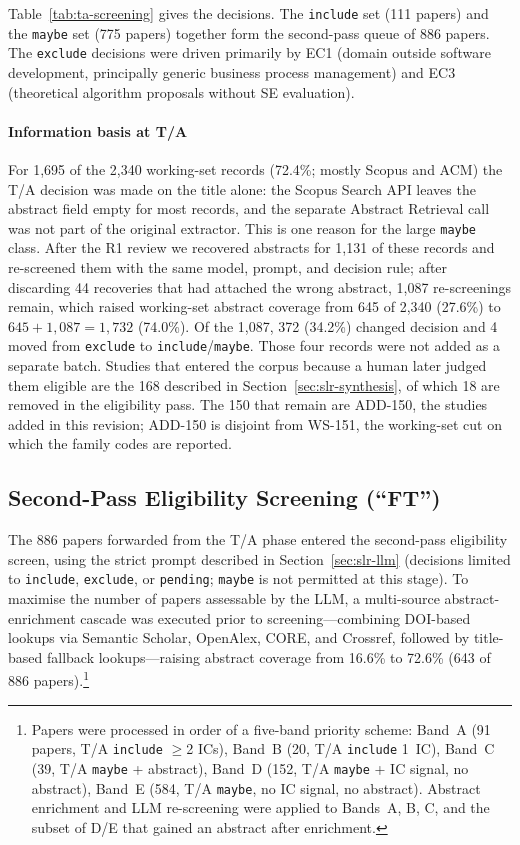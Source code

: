 Table~\ref{tab:ta-screening} gives the decisions. The \texttt{include}
set (111 papers) and the \texttt{maybe} set (775 papers)
together form the second-pass queue of 886 papers. The
\texttt{exclude} decisions were driven primarily by EC1 (domain outside
software development, principally generic business process management) and EC3
(theoretical algorithm proposals without SE evaluation).

\paragraph{Information basis at T/A} For 1{,}695 of the 2{,}340 working-set
records (72.4\%; mostly Scopus and ACM) the T/A decision was made on the
title alone: the Scopus Search API leaves the abstract field empty for most
records, and the separate Abstract Retrieval call was not part of the
original extractor. This is one reason for the large \texttt{maybe} class.
After the R1 review we recovered abstracts for 1{,}131 of these records
and re-screened them with the same model, prompt, and decision rule; after
discarding 44 recoveries that had attached the wrong abstract, 1{,}087
re-screenings remain, which raised working-set abstract coverage from 645
of 2{,}340 (27.6\%) to $645+1{,}087 = 1{,}732$ (74.0\%). Of the 1{,}087,
372 (34.2\%) changed decision and 4 moved from
\texttt{exclude} to \texttt{include}/\texttt{maybe}. Those four records were
not added as a separate batch. Studies that entered the corpus because a
human later judged them eligible are the 168 described in
Section~\ref{sec:slr-synthesis}, of which 18 are removed in the eligibility
pass. The 150 that remain are ADD-150, the studies added in this
revision; ADD-150 is disjoint from WS-151, the working-set cut on which
the family codes are reported.

\subsection{Second-Pass Eligibility Screening (``FT'')}

The 886 papers forwarded from the T/A phase entered the second-pass
eligibility screen, using the strict prompt described in
Section~\ref{sec:slr-llm} (decisions limited to \texttt{include},
\texttt{exclude}, or \texttt{pending}; \texttt{maybe} is not permitted at this
stage). To maximise the number of papers assessable by the LLM, a
multi-source abstract-enrichment cascade was executed prior to
screening---combining DOI-based lookups via Semantic Scholar, OpenAlex, CORE,
and Crossref, followed by title-based fallback lookups---raising abstract
coverage from 16.6\% to 72.6\% (643 of 886 papers).\footnote{Papers were
  processed in order of a five-band priority scheme: Band~A (91 papers,
  T/A \texttt{include} $\geq$2 ICs), Band~B (20, T/A \texttt{include} 1~IC),
  Band~C (39, T/A \texttt{maybe} + abstract), Band~D (152, T/A \texttt{maybe}
  + IC signal, no abstract), Band~E (584, T/A \texttt{maybe}, no IC signal, no
  abstract). Abstract enrichment and LLM re-screening were applied to Bands~A,
  B, C, and the subset of D/E that gained an abstract after enrichment.}

